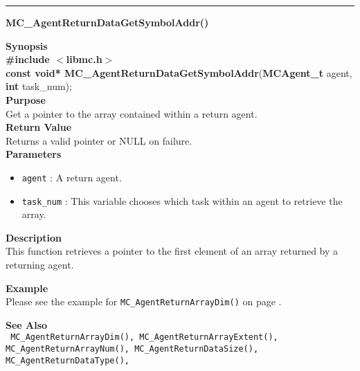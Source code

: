 \noindent
\vspace{5pt}
\rule{6.5in}{0.015in}
\noindent
{}
{\LARGE \bf MC\_AgentReturnDataGetSymbolAddr()}\\
\label{api:MC_AgentReturnDataGetSymbolAddr()}

\noindent
{\bf Synopsis}\\
{\bf \#include $<$libmc.h$>$}\\
{\bf const void* MC\_AgentReturnDataGetSymbolAddr}({\bf MCAgent\_t} agent, {\bf int} task\_num);\\

\noindent
{\bf Purpose}\\
Get a pointer to the array contained within a return agent.\\

\noindent
{\bf Return Value}\\
Returns a valid pointer or NULL on failure.\\

\noindent
{\bf Parameters}
\begin{itemize}
\item \texttt{agent} : A return agent.
\item \texttt{task\_num} : This variable chooses which task within an agent to
retrieve the array.
\end{itemize}


\noindent
{\bf Description}\\
This function retrieves a pointer to the first element of an array returned by
a returning agent.

\noindent
{\bf Example}\\
\noindent
Please see the example for \texttt{MC\_AgentReturnArrayDim()} on page \pageref{api:MC_AgentReturnArrayDim()}.

\noindent
{\bf See Also}\\
\texttt{
  MC\_AgentReturnArrayDim(), MC\_AgentReturnArrayExtent(), MC\_AgentReturnArrayNum(),
  MC\_AgentReturnDataSize(), MC\_AgentReturnDataType(),
}

